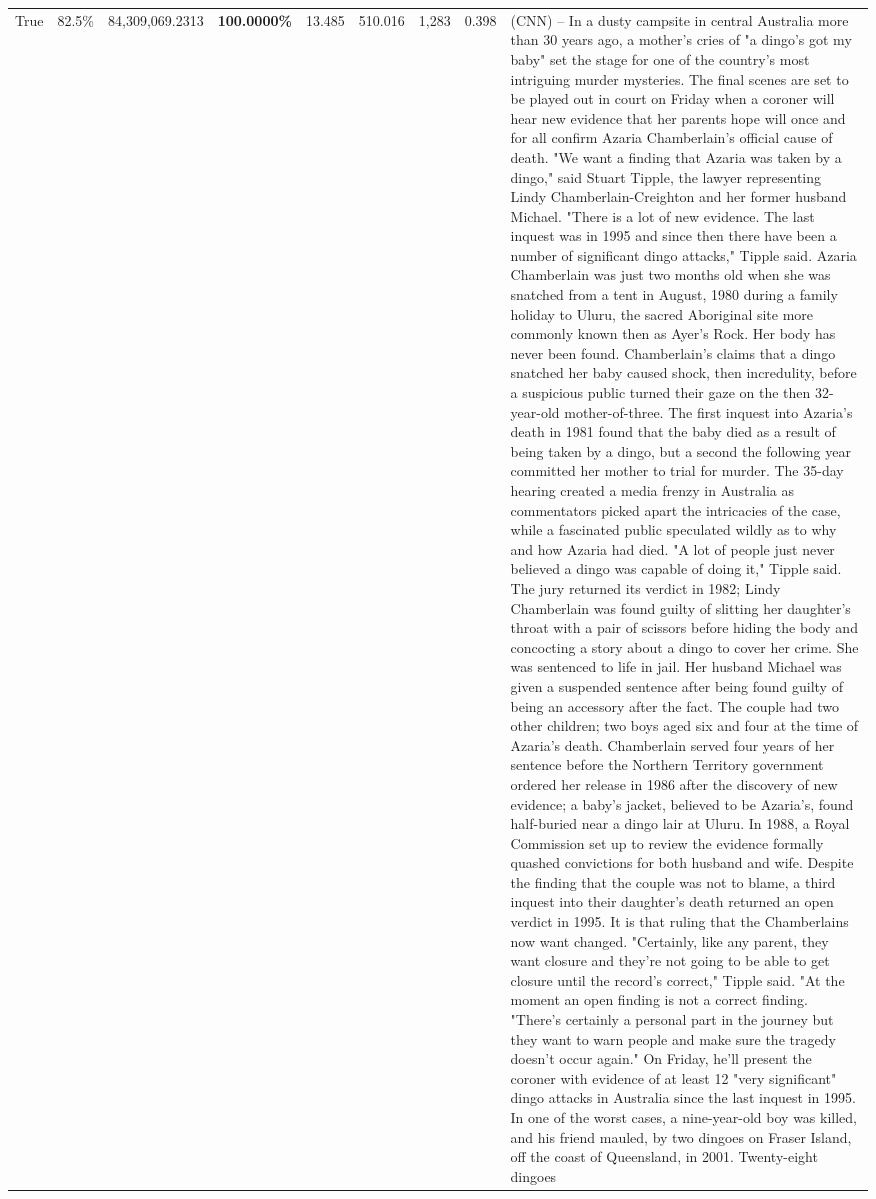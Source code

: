 \begin{table}[H]
\begin{tabular}{lllrlllll}
True & 82.5\% & 84,309,069.2313 & \bfseries \color{red} 100.0000\% & 13.485 & 510.016 & 1,283 & 0.398 & (CNN) -- In a dusty campsite in central Australia more than 30 years ago, a mother's cries of "a dingo's got my baby" set the stage for one of the country's most intriguing murder mysteries. The final scenes are set to be played out in court on Friday when a coroner will hear new evidence that her parents hope will once and for all confirm Azaria Chamberlain's official cause of death. "We want a finding that Azaria was taken by a dingo," said Stuart Tipple, the lawyer representing Lindy Chamberlain-Creighton and her former husband Michael. "There is a lot of new evidence. The last inquest was in 1995 and since then there have been a number of significant dingo attacks," Tipple said. Azaria Chamberlain was just two months old when she was snatched from a tent in August, 1980 during a family holiday to Uluru, the sacred Aboriginal site more commonly known then as Ayer's Rock. Her body has never been found. Chamberlain's claims that a dingo snatched her baby caused shock, then incredulity, before a suspicious public turned their gaze on the then 32-year-old mother-of-three. The first inquest into Azaria's death in 1981 found that the baby died as a result of being taken by a dingo, but a second the following year committed her mother to trial for murder. The 35-day hearing created a media frenzy in Australia as commentators picked apart the intricacies of the case, while a fascinated public speculated wildly as to why and how Azaria had died. "A lot of people just never believed a dingo was capable of doing it," Tipple said. The jury returned its verdict in 1982; Lindy Chamberlain was found guilty of slitting her daughter's throat with a pair of scissors before hiding the body and concocting a story about a dingo to cover her crime. She was sentenced to life in jail. Her husband Michael was given a suspended sentence after being found guilty of being an accessory after the fact. The couple had two other children; two boys aged six and four at the time of Azaria's death. Chamberlain served four years of her sentence before the Northern Territory government ordered her release in 1986 after the discovery of new evidence; a baby's jacket, believed to be Azaria's, found half-buried near a dingo lair at Uluru. In 1988, a Royal Commission set up to review the evidence formally quashed convictions for both husband and wife. Despite the finding that the couple was not to blame, a third inquest into their daughter's death returned an open verdict in 1995. It is that ruling that the Chamberlains now want changed. "Certainly, like any parent, they want closure and they're not going to be able to get closure until the record's correct," Tipple said. "At the moment an open finding is not a correct finding. "There's certainly a personal part in the journey but they want to warn people and make sure the tragedy doesn't occur again." On Friday, he'll present the coroner with evidence of at least 12 "very significant" dingo attacks in Australia since the last inquest in 1995. In one of the worst cases, a nine-year-old boy was killed, and his friend mauled, by two dingoes on Fraser Island, off the coast of Queensland, in 2001. Twenty-eight dingoes 
\end{tabular}
\end{table}
